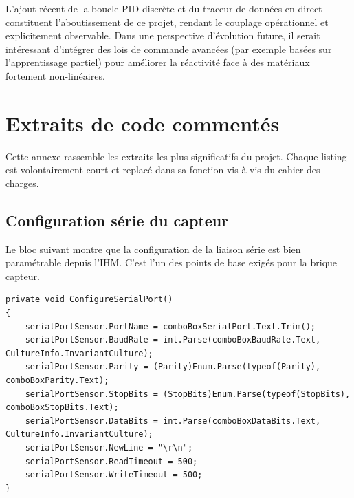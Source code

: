 \documentclass[11pt,a4paper]{article}
\begin{document}
L'ajout r\'ecent de la boucle PID discr\`ete et du traceur de donn\'ees en direct constituent l'aboutissement de ce projet, rendant le couplage op\'erationnel et explicitement observable. Dans une perspective d'\'evolution future, il serait int\'eressant d'int\'egrer des lois de commande avanc\'ees (par exemple bas\'ees sur l'apprentissage partiel) pour am\'eliorer la r\'eactivit\'e face \`a des mat\'eriaux fortement non-lin\'eaires.

\appendix

\section{Extraits de code comment\'es}
\label{ann:code}

Cette annexe rassemble les extraits les plus significatifs du projet. Chaque listing est volontairement court et replac\'e dans sa fonction vis-\`a-vis du cahier des charges.

\subsection{Configuration s\'erie du capteur}
Le bloc suivant montre que la configuration de la liaison s\'erie est bien param\'etrable depuis l'IHM. C'est l'un des points de base exig\'es pour la brique capteur.
\begin{lstlisting}
private void ConfigureSerialPort()
{
    serialPortSensor.PortName = comboBoxSerialPort.Text.Trim();
    serialPortSensor.BaudRate = int.Parse(comboBoxBaudRate.Text, CultureInfo.InvariantCulture);
    serialPortSensor.Parity = (Parity)Enum.Parse(typeof(Parity), comboBoxParity.Text);
    serialPortSensor.StopBits = (StopBits)Enum.Parse(typeof(StopBits), comboBoxStopBits.Text);
    serialPortSensor.DataBits = int.Parse(comboBoxDataBits.Text, CultureInfo.InvariantCulture);
    serialPortSensor.NewLine = "\r\n";
    serialPortSensor.ReadTimeout = 500;
    serialPortSensor.WriteTimeout = 500;
}
\end{lstlisting}
\end{document}
